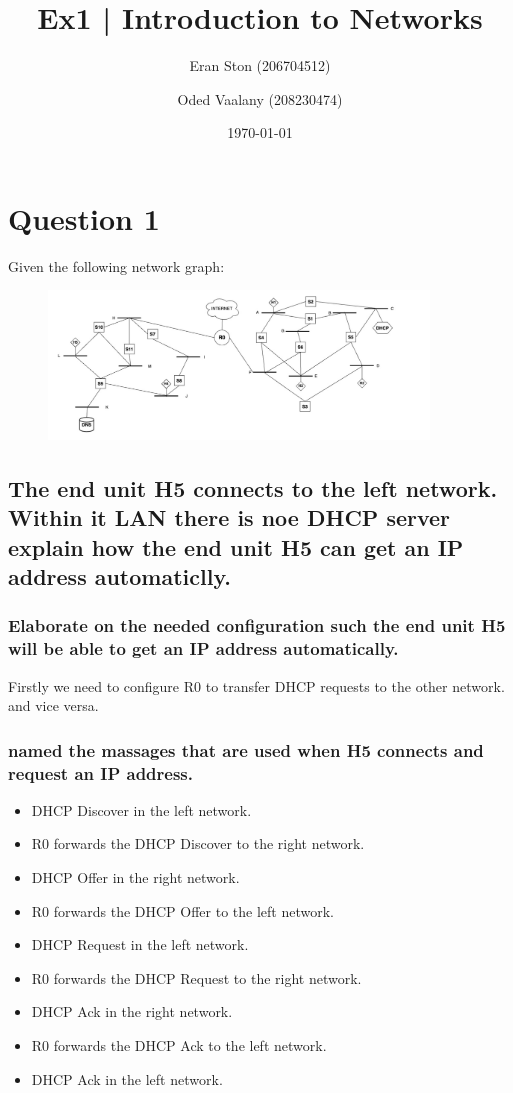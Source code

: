 \documentclass{article}
\title{Ex1 | Introduction to Networks}
\author{Eran Ston (206704512) \and Oded Vaalany (208230474)}
\date{\today}
\begin{document}
\maketitle

\section{Question 1}
Given the following network graph:
\begin{figure}[h]
    \centering
    \includegraphics[width=0.9\textwidth]{question1.png}
\end{figure}

\subsection{The end unit H5 connects to the left network. Within it LAN there is noe DHCP server explain how the end unit H5 can get an IP address automaticlly.}
\subsubsection{Elaborate on the needed configuration such the end unit H5 will be able to get an IP address automatically.}

Firstly we need to configure R0 to transfer DHCP requests to the other network. and vice versa.

\subsubsection{named the massages that are used when H5 connects and request an IP address.}

\begin{itemize}
    \item DHCP Discover in the left network.
    \item R0 forwards the DHCP Discover to the right network.
    \item DHCP Offer in the right network.
    \item R0 forwards the DHCP Offer to the left network.
    \item DHCP Request in the left network.
    \item R0 forwards the DHCP Request to the right network.
    \item DHCP Ack in the right network.
    \item R0 forwards the DHCP Ack to the left network.
    \item DHCP Ack in the left network.
\end{itemize}
\end{document}
